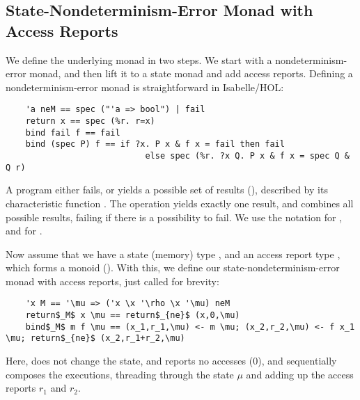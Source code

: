 \documentclass[sn-mathphys,Numbered]{sn-jnl}
\theoremstyle{thmstyleone}%
\theoremstyle{definition}%
\theoremstyle{thmstylethree}%
\begin{document}
  \subsection{State-Nondeterminism-Error Monad with Access Reports}\label{sec:monad}
  We define the underlying monad in two steps. We start with a nondeterminism-error monad,
  and then lift it to a state monad and add access reports.
  Defining a nondeterminism-error monad is straightforward in Isabelle/HOL:
  \begin{lstlisting}
    'a neM == spec ("'a => bool") | fail
    return x == spec (%r. r=x)
    bind fail f == fail
    bind (spec P) f == if ?x. P x & f x = fail then fail
                            else spec (%r. ?x Q. P x & f x = spec Q & Q r)
  \end{lstlisting}
  A program either fails, or yields a possible set of results (), described by its characteristic function .
  The  operation yields exactly one result, and  combines all possible results,
  failing if there is a possibility to fail. We use the notation  for ,
  and  for .

  Now assume that we have a state (memory) type , and an access report type , which forms a monoid ().
  With this, we define our state-nondeterminism-error monad with access reports, just called  for brevity:
  \begin{lstlisting}
    'x M == '\mu => ('x \x '\rho \x '\mu) neM
    return$_M$ x \mu == return$_{ne}$ (x,0,\mu)
    bind$_M$ m f \mu == (x_1,r_1,\mu) <- m \mu; (x_2,r_2,\mu) <- f x_1 \mu; return$_{ne}$ (x_2,r_1+r_2,\mu)
  \end{lstlisting}
  Here,  does not change the state, and reports no accesses (\is$0$),
  and  sequentially composes the executions, threading through the state $\mu$ and adding up the access reports \is$r_1$ and \is$r_2$.
\end{document}
